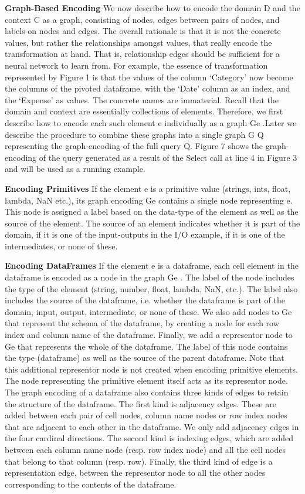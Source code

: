 \documentclass{article}
\begin{document}
\textbf{Graph-Based Encoding} We now describe how to encode the domain D and the context C as a graph, consisting of nodes, edges between pairs of nodes, and labels on nodes and edges. The overall rationale is that it is not the concrete values, but rather the relationships amongst values, that really encode the transformation at hand. That is, relationship edges should be sufficient for a neural network to learn from. For example, the essence of transformation represented by Figure 1 is that the values of the column ‘Category’ now become the columns of the pivoted dataframe, with the ‘Date’ column as an index, and the ‘Expense’ as values. The concrete names are immaterial.
Recall that the domain and context are essentially collections of elements. Therefore, we first describe how to encode each such element e individually as a graph Ge .Later we describe the procedure to combine these graphs into a single graph G Q representing the graph-encoding of the full query Q. Figure 7 shows the graph-encoding of the query generated as a result of the Select call at line 4 in Figure 3 and will be used as a running example.

\textbf{Encoding Primitives} If the element e is a primitive value (strings, ints, float, lambda, NaN etc.), its graph encoding Ge contains a single node representing e. This node is assigned a label based on the data-type of the element as well as the source of the element. The source of an element indicates whether it is part of the domain, if it is one of the input-outputs in the I/O example, if it is one of the intermediates, or none of these.

\textbf{Encoding DataFrames} If the element e is a dataframe, each cell element in the dataframe is encoded as a node in the graph Ge . The label of the node includes the type of the element (string, number, float, lambda, NaN, etc.). The label also includes the source of the dataframe, i.e. whether the dataframe is part of the domain, input, output, intermediate, or none of these. We also add nodes to Ge that represent the schema of the dataframe, by creating a node for each row index and column name of the dataframe. Finally, we add a representor node to Ge that represents the whole of the dataframe. The label of this node contains the type (dataframe) as well as the source of the parent dataframe. Note that this additional representor node is not created when encoding primitive elements. The node representing the primitive element itself acts as its representor node. The graph encoding of a dataframe also contains three kinds of edges to retain the structure of the dataframe. The first kind is adjacency edges. These are added between each pair of cell nodes, column name nodes or row index nodes that are adjacent to each other in the dataframe. We only add adjacency edges in the four cardinal directions. The second kind is indexing edges, which are added between each column name node (resp. row index node) and all the cell nodes that belong to that column (resp. row). Finally, the third kind of edge is a representation edge, between the representor node to all the other nodes corresponding to the contents of the dataframe.
\end{document}
